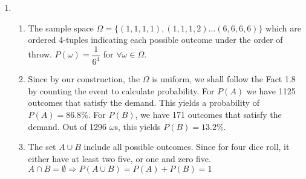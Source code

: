 \documentclass[11pt, oneside]{article}
\begin{document}
\begin{enumerate}
    \item \begin{enumerate}
        \item The sample space $\Omega= \{(1,1,1,1), (1,1,1,2)...(6,6,6,6) \}$ which are ordered 4-tuples indicating each possible outcome under the order of throw. $P(\omega)=\dfrac{1}{6^4}$ for $\forall \omega \in \Omega$.
        \item Since by our construction, the $\Omega$ is uniform, we shall follow the Fact 1.8 by counting the event to calculate probability. 
        \newline For $P(A)$  we have 1125 outcomes that satisfy the demand. This yields a probability of $P(A)=86.8\%$. 
        \newline For $P(B)$, we have 171 outcomes that satisfy the demand. Out of 1296 $\omega$s, this yields $P(B)=13.2\% $. 
        \item The set $A\cup B$ include all possible outcomes. Since for four dice roll, it either have at least two five, or one and zero five.  $A \cap B =\emptyset \Rightarrow P(A\cup B)= P(A)+P(B)=1$
        

\end{enumerate}
\end{enumerate}
\end{document}
